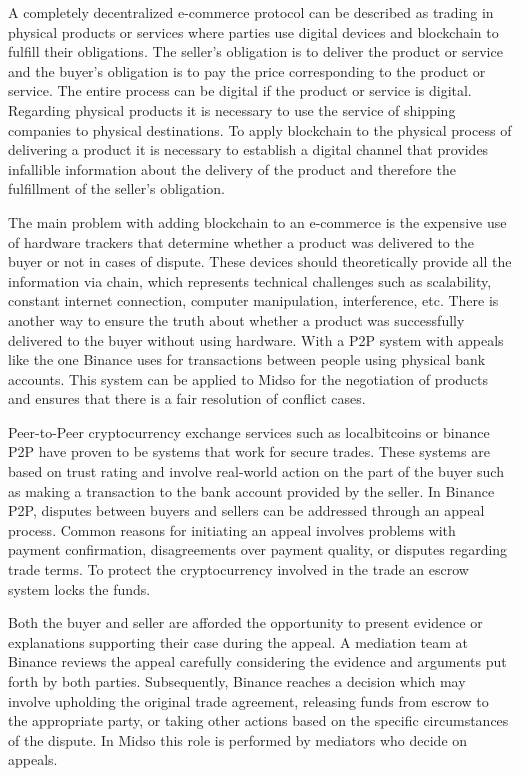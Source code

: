\documentclass[12pt]{article}
\begin{document}
A completely decentralized e-commerce protocol can be described as trading in physical products or services where parties use digital devices and blockchain to fulfill their obligations.
The seller's obligation is to deliver the product or service and the buyer's obligation is to pay the price corresponding to the product or service. 
The entire process can be digital if the product or service is digital.
Regarding physical products it is necessary to use the service of shipping companies to physical destinations.
To apply blockchain to the physical process of delivering a product it is necessary to establish a digital channel that provides infallible information about the delivery of the product and therefore the fulfillment of the seller's obligation. 

The main problem with adding blockchain to an e-commerce is the expensive use of hardware trackers that determine whether a product was delivered to the buyer or not in cases of dispute. These devices should theoretically provide all the information via chain, which represents technical challenges such as scalability, constant internet connection, computer manipulation, interference, etc. There is another way to ensure the truth about whether a product was successfully delivered to the buyer without using hardware. With a P2P system with appeals like the one Binance uses for transactions between people using physical bank accounts. This system can be applied to Midso for the negotiation of products and ensures that there is a fair resolution of conflict cases.

Peer-to-Peer cryptocurrency exchange services such as localbitcoins or binance P2P have proven to be systems that work for secure trades. These systems are based on trust rating and involve real-world action on the part of the buyer such as making a transaction to the bank account provided by the seller. In Binance P2P, disputes between buyers and sellers can be addressed through an appeal process. Common reasons for initiating an appeal involves problems with payment confirmation, disagreements over payment quality, or disputes regarding trade terms. To protect the cryptocurrency involved in the trade an escrow system locks the funds.

Both the buyer and seller are afforded the opportunity to present evidence or explanations supporting their case during the appeal. A mediation team at Binance reviews the appeal carefully considering the evidence and arguments put forth by both parties. Subsequently, Binance reaches a decision which may involve upholding the original trade agreement, releasing funds from escrow to the appropriate party, or taking other actions based on the specific circumstances of the dispute. In Midso this role is performed by mediators who decide on appeals.
\end{document}
